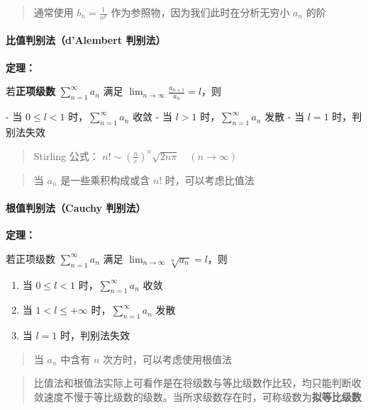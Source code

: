 \documentclass[lang = zh , final , oneside , openany , titlepage , zihao = -4 , linespread = 1.3 , baselineskip = false , cjk-font = windows , text-font = newtx , math-font = newtx]{sjtureport}
\begin{document}
\begin{quote}
通常使用 \(b_n = \frac{1}{n^p}\) 作为参照物，因为我们此时在分析无穷小 \(a_n\) 的阶
\end{quote}

\paragraph{比值判别法（d'Alembert 判别法）}

\textbf{定理：}

若\textbf{正项级数} \(\sum_{n = 1}^\infty a_n\) 满足 \(\lim_{n\to\infty} \frac{a_{n + 1}}{a_n} = l\)，则

- 当 \(0\leq l < 1\) 时，\(\sum_{n = 1}^\infty a_n\) 收敛
- 当 \(l > 1\) 时，\(\sum_{n = 1}^\infty a_n\) 发散
- 当 \(l = 1\) 时，判别法失效

\begin{quote}
Stirling 公式： \(n! \sim \left(\frac{n}{e}\right)^n \sqrt{2n\pi} \quad (n\to\infty)\)
\end{quote}

\begin{quote}
当 \(a_n\) 是一些乘积构成或含 \(n!\) 时，可以考虑比值法
\end{quote}

\paragraph{根值判别法（Cauchy 判别法）}

\textbf{定理：}

若正项级数 \(\sum_{n = 1}^\infty a_n\) 满足 \(\lim_{n\to\infty} \sqrt[n]{a_n} = l\)，则

\begin{enumerate}
    \item 当 \(0\leq l < 1\) 时，\(\sum_{n = 1}^\infty a_n\) 收敛
    \item 当 \(1 < l \leq +\infty\) 时，\(\sum_{n = 1}^\infty a_n\) 发散
    \item 当 \(l = 1\) 时，判别法失效
\end{enumerate}

\begin{quote}
当 \(a_n\) 中含有 \(n\) 次方时，可以考虑使用根值法
\end{quote}

\begin{quote}
比值法和根值法实际上可看作是在将级数与等比级数作比较，均只能判断收敛速度不慢于等比级数的级数。当所求级数存在时，可称级数为\textbf{拟等比级数}
\end{quote}
\end{document}

